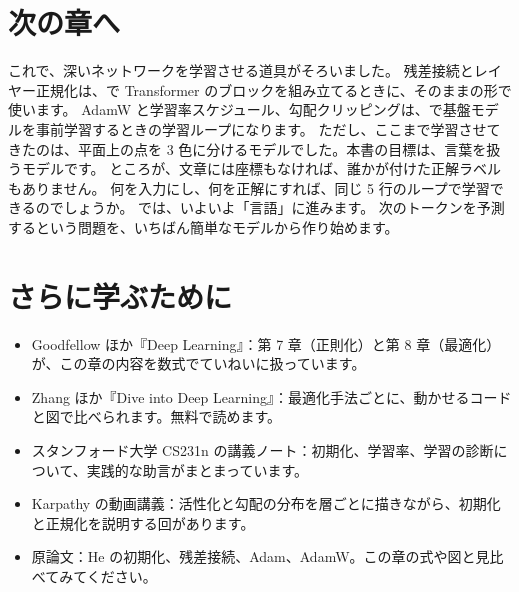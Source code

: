 \section*{次の章へ}

これで、深いネットワークを学習させる道具がそろいました。
残差接続とレイヤー正規化は、で Transformer のブロックを組み立てるときに、そのままの形で使います。
AdamW と学習率スケジュール、勾配クリッピングは、で基盤モデルを事前学習するときの学習ループになります。
ただし、ここまで学習させてきたのは、平面上の点を 3 色に分けるモデルでした。本書の目標は、言葉を扱うモデルです。
ところが、文章には座標もなければ、誰かが付けた正解ラベルもありません。
何を入力にし、何を正解にすれば、同じ 5 行のループで学習できるのでしょうか。
では、いよいよ「言語」に進みます。
次のトークンを予測するという問題を、いちばん簡単なモデルから作り始めます。

\section*{さらに学ぶために}

\begin{itemize}
\item Goodfellow ほか『Deep Learning』\cite{goodfellow2016deep}：第 7 章（正則化）と第 8 章（最適化）が、この章の内容を数式でていねいに扱っています。
\item Zhang ほか『Dive into Deep Learning』\cite{zhang2023d2l}：最適化手法ごとに、動かせるコードと図で比べられます。無料で読めます。
\item スタンフォード大学 CS231n の講義ノート\cite{cs231n}：初期化、学習率、学習の診断について、実践的な助言がまとまっています。
\item Karpathy の動画講義\cite{karpathy2022zerotohero}：活性化と勾配の分布を層ごとに描きながら、初期化と正規化を説明する回があります。
\item 原論文：He の初期化\cite{he2015delving}、残差接続\cite{he2016deep}、Adam\cite{kingma2015adam}、AdamW\cite{loshchilov2019decoupled}。この章の式や図と見比べてみてください。
\end{itemize}

